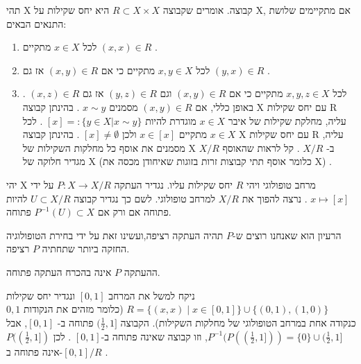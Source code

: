 \documentclass{tstextbook}
\begin{document}
\begin{reminder}
תהי X קבוצה. אומרים שקבוצה \(R\subset X\times X\) היא יחס שקילות על X, אם מתקיימים שלושת התנאים הבאים:

  \begin{enumerate}
    \item לכל \(x\in X\) מתקיים \((x,x)\in R\) . 


    \item לכל \(x,y\in X\) מתקיים כי אם \((x,y)\in R\) אז גם \((y,x)\in R\) . 


    \item לכל \(x,y,z\in X\) מתקיים כי אם \((x,y)\in R\) וגם \((y,z)\in R\) אז גם \((x,z)\in R\) . 
באופן כללי, אם \((x,y)\in R\) מסמנים \(x\sim y\) .
בהינתן קבוצה X עם יחס שקילות R עליה, מחלקת שקילות של איבר \(x\in X\) מוגדרת להיות \([x]=:\{y\in X|x\sim y\}\) .
לכל \(x\in X\) מתקיים \(x\in[x]\) ולכן \([x]\ne\emptyset\) .
בהינתן קבוצה X עם יחס שקילות R עליה, מסמנים את אוסף כל מחלקות השקילות של X ב- \(X/R\) . קל לראות שהאוסף \(X/R\) מגדיר חלוקה של X (כלומר אוסף תתי קבוצות זרות בזוגות שאיחודן מכסה את X) .


  \end{enumerate}
\end{reminder}
\begin{definition}
יהי X מרחב טופולוגי ויהי \(R\) יחס שקילות עליו.
נגדיר העתקה \(P:X\rightarrow X/R\) על ידי \(x\mapsto[x]\) .
נרצה להפוך את \(X/R\) למרחב טופולוגי. לשם כך נגדיר קבוצה \(U\subset X/R\) להיות פתוחה אם ורק אם \(P^{-1}(U)\subset X\) פתוחה.

\end{definition}
\begin{remark}
הרעיון הוא שאנחנו רוצים ש-\(P\) תהיה העתקה רציפה,ועשינו זאת על ידי בחירת הטופולוגיה החזקה ביותר שתחתיה \(P\) רציפה.

\end{remark}
\begin{remark}
ההעתקה \(P\) אינה בהכרח העתקה פתוחה.

\end{remark}
\begin{example}
ניקח למשל את המרחב \([0,1]\) ונגדיר יחס שקילות \(R=\{(x,x) \mid x\in[0,1]\}\cup\{(0,1),(1,0)\}\) (כלומר מזהים את הנקודות \(0,1\) כנקודה אחת במרחב הטופולוגי של מחלקות השקילות).
הקבוצה \((\frac{1}{2},1]\) פתוחה ב- \([0,1]\), אבל \(P^{-1}(P((\frac{1}{2},1]))=\{0\}\cup(\frac{1}{2},1]\), וזו קבוצה שאינה פתוחה ב-\([0,1]\) . לכן \(P((\frac{1}{2},1])\) אינה פתוחה ב-\([0,1]/R\) .

\end{example}
\end{document}
